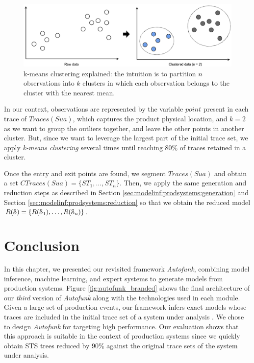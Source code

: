 \begin{figure}[ht]
    \begin{center}
        \includegraphics[width=1.0\linewidth]{figures/kmeans.png}
    \end{center}

    \caption{k-means clustering explained: the intuition is to
    partition $n$ observations into $k$ clusters in which each
    observation belongs to the cluster with the nearest mean.}
    \label{fig:kmeans}
\end{figure}

In our context, observations are represented by the variable
$point$ present in each trace of $Traces({Sua})$, which captures
the product physical location, and $k=2$ as we want to group the
outliers together, and leave the other points in another cluster.
But, since we want to leverage the largest part of the initial
trace set, we apply \textit{k-means clustering} several times
until reaching 80\% of traces retained in a cluster.

Once the entry and exit points are found, we segment
$Traces({Sua})$ and obtain a set $CTraces({Sua})=\{ST_1, \dots,
ST_n\}$. Then, we apply the same generation and reduction steps
as described in Section \ref{sec:modelinf:prodsystems:generation}
and Section \ref{sec:modelinf:prodsystems:reduction} so that we
obtain the reduced model $R(\EuScript{S}) =
\{R(\EuScript{S}_1),\dots,R(\EuScript{S}_n)\}$.


\section{Conclusion}
\label{sec:modelinf:prodsystems:conclusion}

In this chapter, we presented our revisited framework
\textit{Autofunk}, combining model inference, machine learning,
and expert systems to generate models from production systems.
Figure \ref{fig:autofunk_branded} shows the final architecture of
our \emph{third} version of \textit{Autofunk} along with the
technologies used in each module. Given a large set of production
events, our framework infers exact models whose traces are
included in the initial trace set of a system under analysis
\cite{petrenko06}.  We chose to design \textit{Autofunk} for
targeting high performance. Our evaluation shows that this
approach is suitable in the context of production systems since
we quickly obtain STS trees reduced by 90\% against the original
trace sets of the system under analysis.

